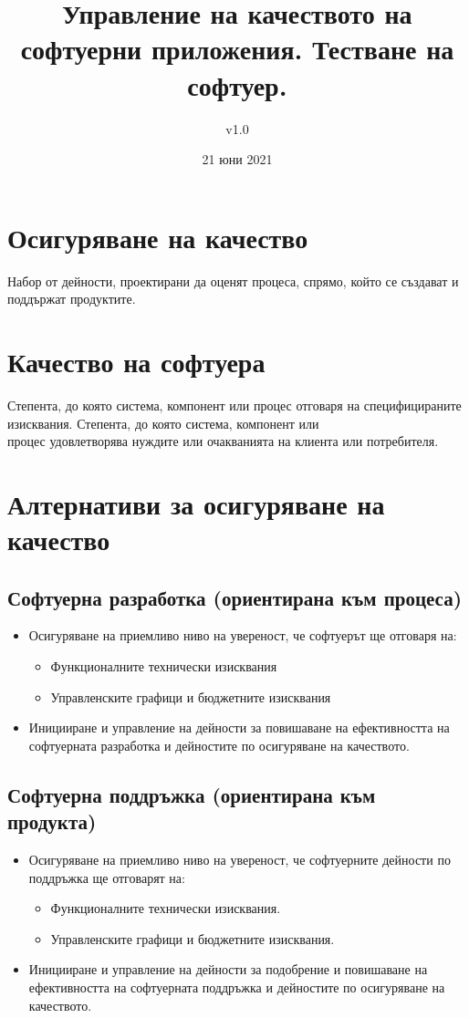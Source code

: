 \documentclass[fleqn,12pt]{article}
\title{Управление на качеството на софтуерни приложения. Тестване на софтуер.}
\author{v1.0}
\date{21 юни 2021}
\begin{document}
\maketitle

\tableofcontents

\begin{flushleft}

\section{Осигуряване на качество}
Набор от дейности, проектирани да оценят процеса, спрямо, който се създават и поддържат продуктите.

\section{Качество на софтуера}
Степента, до която система, компонент или процес отговаря на специфицираните изисквания. Степента, до която система, компонент или\\
процес удовлетворява нуждите или очакванията на клиента или потребителя.

\section{Алтернативи за осигуряване на качество}
  \subsection{Софтуерна разработка (ориентирана към процеса)}
  \begin{itemize}
    \item Осигуряване на приемливо ниво на увереност, че софтуерът ще отговаря на:
      \begin{itemize}
        \item Функционалните технически изисквания
        \item Управленските графици и бюджетните изисквания
      \end{itemize}
    \item Иницииране и управление на дейности за повишаване на ефективността на софтуерната разработка и дейностите по осигуряване на качеството.
  \end{itemize}
  \subsection{Софтуерна поддръжка (ориентирана към продукта)}
  \begin{itemize}
    \item Осигуряване на приемливо ниво на увереност, че софтуерните дейности по поддръжка ще отговарят на:
        \begin{itemize}
            \item Функционалните технически изисквания.
            \item Управленските графици и бюджетните изисквания.
        \end{itemize}
    \item Иницииране и управление на дейности за подобрение и повишаване на ефективността на софтуерната поддръжка и дейностите по осигуряване на качеството.
  \end{itemize}

\end{flushleft}
\end{document}
